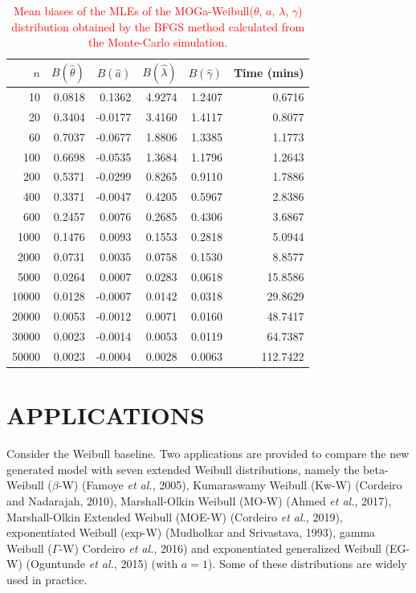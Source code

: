 \documentclass[twoside,leqno,11pt]{article}
\begin{document}
\begin{table}[H]
	\centering
	\caption{\textcolor{red}{Mean biases of the MLEs of the MOGa-Weibull($\theta$, $a$, $\lambda$, $\gamma$) distribution obtained by the BFGS method calculated from the Monte-Carlo simulation.}}\label{tab:bias2}
	\begin{tabular}{rrrrrr}
		\hline
		$n$ & $B(\hat{\theta})$ & $B(\hat{a})$ & $B(\hat{\lambda})$ & $B(\hat{\gamma})$ & Time (mins)\\
		\hline
		10 & 0.0818 & 0.1362 & 4.9274 & 1.2407 & 0.6716 \\ 
		20 & 0.3404 & -0.0177 & 3.4160 & 1.4117 & 0.8077 \\ 
		60 & 0.7037 & -0.0677 & 1.8806 & 1.3385 & 1.1773 \\ 
		100 & 0.6698 & -0.0535 & 1.3684 & 1.1796 & 1.2643 \\ 
		200 & 0.5371 & -0.0299 & 0.8265 & 0.9110 & 1.7886 \\ 
		400 & 0.3371 & -0.0047 & 0.4205 & 0.5967 & 2.8386 \\ 
		600 & 0.2457 & 0.0076 & 0.2685 & 0.4306 & 3.6867 \\ 
		1000 & 0.1476 & 0.0093 & 0.1553 & 0.2818 & 5.0944 \\ 
		2000 & 0.0731 & 0.0035 & 0.0758 & 0.1530 & 8.8577 \\ 
		5000 & 0.0264 & 0.0007 & 0.0283 & 0.0618 & 15.8586 \\ 
		10000 & 0.0128 & -0.0007 & 0.0142 & 0.0318 & 29.8629 \\ 
		20000 & 0.0053 & -0.0012 & 0.0071 & 0.0160 & 48.7417 \\ 
		30000 & 0.0023 & -0.0014 & 0.0053 & 0.0119 & 64.7387 \\ 
		50000 & 0.0023 & -0.0004 & 0.0028 & 0.0063 & 112.7422 \\ 
		\hline
\end{tabular}
\end{table}


\section{APPLICATIONS}\label{applications}

Consider the Weibull baseline. Two applications are provided to compare the new generated model with seven extended Weibull
distributions, namely the beta-Weibull ($\beta$-W) (Famoye {\it et al.}, 2005), Kumaraswamy Weibull (Kw-W) (Cordeiro and Nadarajah, 2010),
Marshall-Olkin Weibull (MO-W) (Ahmed {\it et al.}, 2017), Marshall-Olkin Extended Weibull (MOE-W) (Cordeiro {\it et al.}, 2019),
exponentiated Weibull (exp-W) (Mudholkar and Srivastava, 1993), gamma Weibull ($\Gamma$-W) Cordeiro {\it et al.}, 2016) and exponentiated
generalized Weibull (EG-W) (Oguntunde {\it et al.}, 2015) (with $a=1$). Some of these distributions are widely used in practice.
\end{document}
